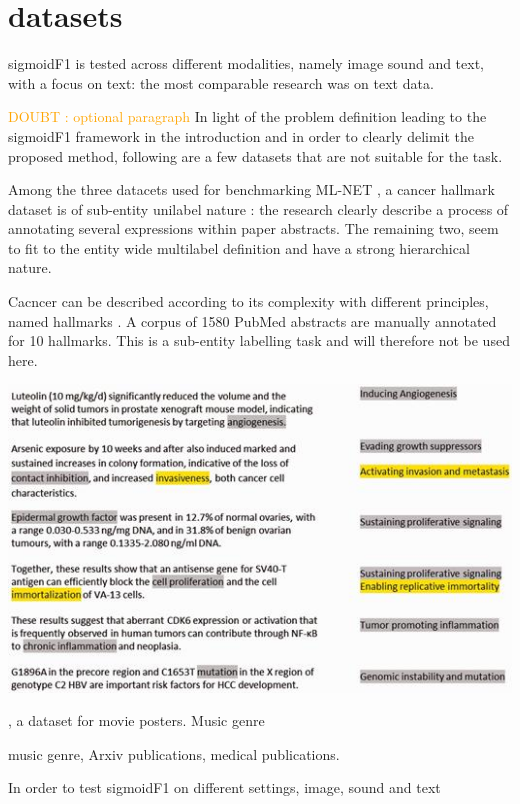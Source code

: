\documentclass[sigconf,natbib,screen=true,review=true,anonymous]{acmart}
\newcommand\doubt[1]{\textcolor{orange}{DOUBT : #1}}
\begin{document}
\section{datasets}
\label{sec:orga7de626}

sigmoidF1 is tested across different modalities, namely image sound and text, with a focus on text: the most comparable research was on text data.

\doubt{optional paragraph}
In light of the problem definition leading to the sigmoidF1 framework in the introduction and in order to clearly delimit the proposed method, following are a few datasets that are not suitable for the task.


Among the three datacets used for benchmarking ML-NET \cite{multitaskLabel}, a cancer hallmark dataset is of sub-entity unilabel nature \cite{cancerHallmarks}: the research clearly describe a process of annotating several expressions within paper abstracts. The remaining two, seem to fit to the entity wide multilabel definition and have a strong hierarchical nature.


Cacncer can be described according to its complexity with different principles, named hallmarks \cite{cancerHallmarks}. A corpus of 1580 PubMed abstracts are manually annotated for 10 hallmarks. This is a sub-entity labelling task and will therefore not be used here.

\begin{center}
\includegraphics[width=.9\linewidth]{./images/cancerHallmarksAnnotation.jpg}
\end{center}




, a dataset for movie posters. Music genre 

music genre, Arxiv publications, medical publications.

In order to test sigmoidF1 on different settings, image, sound and text 
\end{document}
